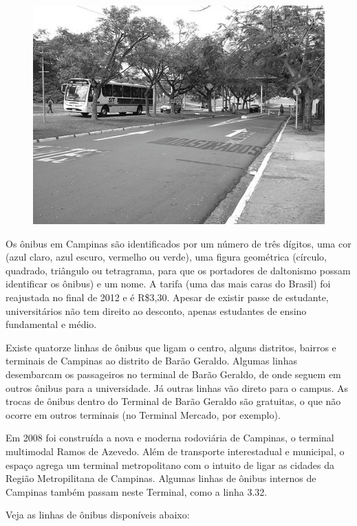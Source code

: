 \begin{figure}[h!]
    \centering
    \includegraphics[scale=0.58,keepaspectratio=true]{img/imgs/8-transporte/-085.jpg}
\end{figure}

Os ônibus em Campinas são identificados por um número de três dígitos, uma cor
(azul claro, azul escuro, vermelho ou verde), uma figura geométrica (círculo,
quadrado, triângulo ou tetragrama, para que os portadores de daltonismo possam
identificar os ônibus) e um nome. A tarifa (uma das mais caras do Brasil) foi
reajustada no final de 2012 e é R\$3,30. Apesar de existir passe de estudante,
universitários não tem direito ao desconto, apenas estudantes de ensino
fundamental e médio.

Existe quatorze linhas de ônibus que ligam o centro, alguns distritos, bairros
e terminais de Campinas ao distrito de Barão Geraldo. Algumas linhas desembarcam
os passageiros no terminal de Barão Geraldo, de onde seguem em outros ônibus
para a universidade. Já outras linhas vão direto para o campus. As trocas de
ônibus dentro do Terminal de Barão Geraldo são gratuitas, o que não ocorre em
outros terminais (no Terminal Mercado, por exemplo).

Em 2008 foi construída a nova e moderna rodoviária de Campinas, o terminal
multimodal Ramos de Azevedo. Além de transporte interestadual e municipal,
o espaço agrega um terminal metropolitano com o intuito de ligar as cidades da
Região Metropilitana de Campinas. Algumas linhas de ônibus internos de Campinas
também passam neste Terminal, como a linha 3.32.

Veja as linhas de ônibus disponíveis abaixo:

